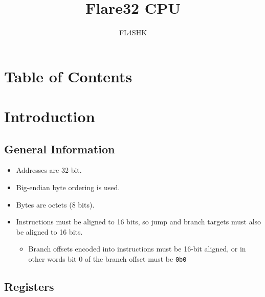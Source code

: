 \documentclass{article}
\title{Flare32 CPU}
\author{FL4SHK}
\makeatletter
\renewcommand\tableofcontents{%
    \@starttoc{toc}%
}
\makeatother
\begin{document}
	\maketitle
	\newpage



	\newpage
	\singlespacing
	\section{Table of Contents}
	\tableofcontents
	\newpage

	\section{Introduction}

	\subsection{General Information}
		\begin{itemize}
		\item Addresses are 32-bit.
		\item Big-endian byte ordering is used. 
		\item Bytes are octets (8 bits).
		\item Instructions must be aligned to 16 bits, so jump and
			branch targets must also be aligned to 16 bits.
			\begin{itemize}
			\item Branch offsets encoded into instructions must be
				16-bit aligned, or in other words bit 0 of the branch
				offset must be \texttt{0b0}
			\end{itemize}
		\end{itemize}

	\subsection{Registers}
\end{document}
